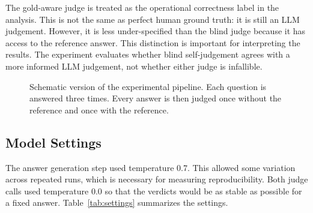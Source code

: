 \documentclass[11pt,a4paper]{article}
\begin{document}
The gold-aware judge is treated as the operational correctness label in the analysis. This is not the same as perfect human ground truth: it is still an LLM judgement. However, it is less under-specified than the blind judge because it has access to the reference answer. This distinction is important for interpreting the results. The experiment evaluates whether blind self-judgement agrees with a more informed LLM judgement, not whether either judge is infallible.

\begin{figure}[H]
    \centering
    \caption{Schematic version of the experimental pipeline. Each question is answered three times. Every answer is then judged once without the reference and once with the reference.}
    \label{fig:pipeline}
\end{figure}

\subsection{Model Settings}

The answer generation step used temperature 0.7. This allowed some variation across repeated runs, which is necessary for measuring reproducibility. Both judge calls used temperature 0.0 so that the verdicts would be as stable as possible for a fixed answer. Table~\ref{tab:settings} summarizes the settings.
\end{document}
